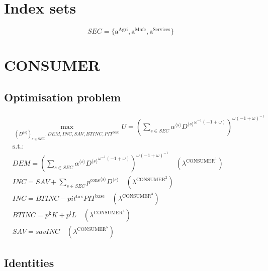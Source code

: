 

\section*{Index sets}

$${S\!E\!C} = \{ \mathrm{a}^{\mathrm{Agri}}, \mathrm{a}^{\mathrm{Mnfc}}, \mathrm{a}^{\mathrm{Services}} \}$$

\section{CONSUMER}

\subsection{Optimisation problem}

\begin{align}
&\max_{\left({D}^{\langle s\rangle}\right)_{s\in {S\!E\!C}}, {D\!E\!M}, {I\!N\!C}, {S\!A\!V}, {B\!T\!I\!N\!C}, {P\!I\!T}^{\mathrm{base}}
} U = \left(\sum_{s\in {S\!E\!C}} {{\alpha}^{\langle s\rangle}} {{{D}^{\langle s\rangle}}^{{\omega}^{-1} \left(-1 + \omega\right)}}\right)^{{\omega} \left(-1 + \omega\right)^{-1}}\\
&\mathrm{s.t.:}\nonumber\\
& {D\!E\!M} = \left(\sum_{s\in {S\!E\!C}} {{\alpha}^{\langle s\rangle}} {{{D}^{\langle s\rangle}}^{{\omega}^{-1} \left(-1 + \omega\right)}}\right)^{{\omega} \left(-1 + \omega\right)^{-1}} \quad \left(\lambda^{\mathrm{CONSUMER}^{\mathrm{1}}}\right)\\
& {I\!N\!C} = {S\!A\!V} + \sum_{s\in {S\!E\!C}} {{p^{\mathrm{cons}}}^{\langle s\rangle}} {{D}^{\langle s\rangle}} \quad \left(\lambda^{\mathrm{CONSUMER}^{\mathrm{2}}}\right)\\
& {I\!N\!C} = {B\!T\!I\!N\!C} - {{p\!i\!t}^{\mathrm{tax}}} {{P\!I\!T}^{\mathrm{base}}} \quad \left(\lambda^{\mathrm{CONSUMER}^{\mathrm{3}}}\right)\\
& {B\!T\!I\!N\!C} = {p^{\mathrm{k}}} {K} + {p^{\mathrm{l}}} {L} \quad \left(\lambda^{\mathrm{CONSUMER}^{\mathrm{4}}}\right)\\
& {S\!A\!V} = {{s\!a\!v}} {{I\!N\!C}} \quad \left(\lambda^{\mathrm{CONSUMER}^{\mathrm{5}}}\right)
\end{align}


\subsection{Identities}

